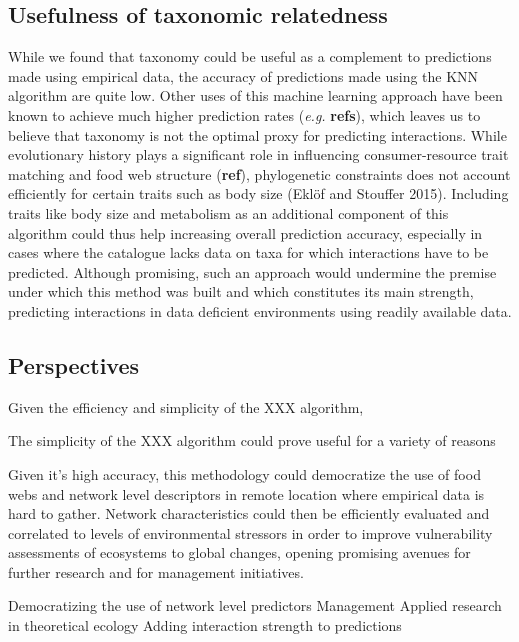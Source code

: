 \documentclass[letterpaper]{article}
\begin{document}
\subsection{Usefulness of taxonomic relatedness}
 While we found that taxonomy could be useful as a complement to predictions made using empirical data, the accuracy of predictions made using the KNN algorithm are quite low. Other uses of this machine learning approach have been known to achieve much higher prediction rates (\textit{e.g.} \textbf{refs}), which leaves us to believe that taxonomy is not the optimal proxy for predicting interactions. While evolutionary history plays a significant role in influencing consumer-resource trait matching and food web structure (\textbf{ref}), phylogenetic constraints does not account efficiently for certain traits such as body size (Eklöf and Stouffer 2015). Including traits like body size and metabolism as an additional component of this algorithm could thus help increasing overall prediction accuracy, especially in cases where the catalogue lacks data on taxa for which interactions have to be predicted. Although promising, such an approach would undermine the premise under which this method was built and which constitutes its main strength, predicting interactions in data deficient environments using readily available data.





\subsection{Perspectives}
Given the efficiency and simplicity of the XXX algorithm,

The simplicity of the XXX algorithm could prove useful for a variety of reasons



Given it’s high accuracy, this methodology could democratize the use of food webs and network level descriptors in remote location where empirical data is hard to gather. Network characteristics could then be efficiently evaluated and correlated to levels of environmental stressors in order to improve vulnerability assessments of ecosystems to global changes, opening promising avenues for further research and for management initiatives.



Democratizing the use of network level predictors
Management
Applied research in theoretical ecology
Adding interaction strength to predictions
\end{document}
